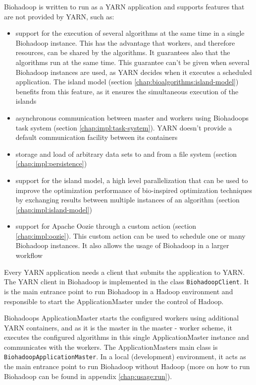Biohadoop is written to run as a YARN application and supports features that are not provided by YARN, such as:

\begin{itemize}
  \item support for the execution of several algorithms at the same time in a single Biohadoop instance. This has the advantage that workers, and therefore resources, can be shared by the algorithms. It guarantees also that the algorithms run at the same time. This guarantee can't be given when several Biohadoop instances are used, as YARN decides when it executes a scheduled application. The island model (section \ref{chap:bioalgorithms:island-model}) benefits from this feature, as it ensures the simultaneous execution of the islands
  \item asynchronous communication between master and workers using Biohadoops task system (section \ref{chap:impl:task-system}). YARN doesn't provide a default communication facility between its containers
  \item storage and load of arbitrary data sets to and from a file system (section \ref{chap:impl:persistence})
  \item support for the island model, a high level parallelization that can be used to improve the optimization performance of bio-inspired optimization techniques by exchanging results between multiple instances of an algorithm (section \ref{chap:impl:island-model})
  \item support for Apache Oozie through a custom action (section \ref{chap:impl:oozie}). This custom action can be used to schedule one or many Biohadoop instances. It also allows the usage of Biohadoop in a larger workflow
\end{itemize}

Every YARN application needs a client that submits the application to YARN. The YARN client in Biohadoop is implemented in the class \texttt{BiohadoopClient}. It is the main entrance point to run Biohadoop in a Hadoop environment and responsible to start the ApplicationMaster under the control of Hadoop.

Biohadoops ApplicationMaster starts the configured workers using additional YARN containers, and as it is the master in the master - worker scheme, it executes the configured algorithms in this single ApplicationMaster instance and communicates with the workers. The ApplicationMasters main class is \texttt{BiohadoopApplicationMaster}. In a local (development) environment, it acts as the main entrance point to run Biohadoop without Hadoop (more on how to run Biohadoop can be found in appendix \ref{chap:usage:run}).

